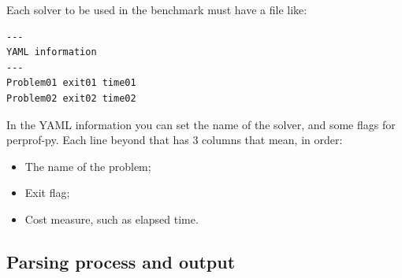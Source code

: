     Each solver to be used in the benchmark must have a file like:

    \begin{verbatim}
---
YAML information
---
Problem01 exit01 time01
Problem02 exit02 time02
    \end{verbatim}

    In the YAML information you can set the name of the solver, and some
    flags for perprof-py.
    Each line beyond that has 3 columns that mean, in order:
    \begin{itemize}
      \item The name of the problem;
      \item Exit flag;
      \item Cost measure, such as elapsed time.
    \end{itemize}

\subsection*{Parsing process and output}

